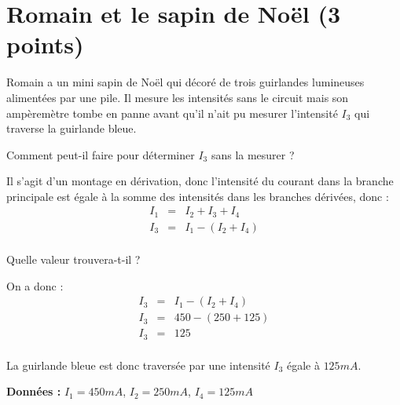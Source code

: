 \section{Romain et le sapin de Noël (3 points)}

	Romain a un mini sapin de Noël qui décoré de trois guirlandes lumineuses alimentées par une pile. Il mesure les intensités sans le circuit mais son ampèremètre tombe en panne avant qu'il n'ait pu mesurer l'intensité $I_3$ qui traverse la guirlande bleue.
	
	\begin{questions}
		\question Comment peut-il faire pour déterminer $I_3$ sans la mesurer ? 
		
		\begin{solution}
			Il s'agit d'un montage en dérivation, donc l'intensité du courant dans la branche principale est égale à la somme des intensités dans les branches dérivées, donc :
			\begin{eqnarray*}
				I_1 &=& I_2 + I_3 + I_4 \\
				I_3 &=& I_1 - (I_2 + I_4) \\
			\end{eqnarray*}
		\vspace*{-0.8cm}
		\end{solution}
	
		\question Quelle valeur trouvera-t-il ?
		
		\begin{solution}
			On a donc :			
			\vspace*{-0.8cm}
			\begin{eqnarray*}			
				I_3 &=& I_1 - (I_2 + I_4)\\
				I_3 &=& 450 - (250 + 125)\\
				I_3 &=& 125\\
			\end{eqnarray*}		
		
		\vspace*{-0.8cm}			
			La guirlande bleue est donc traversée par une intensité $I_3$ égale à $125 mA$.
		\end{solution}
	\end{questions}

\textbf{Données : } $I_1 = 450 mA$, $I_2 = 250 mA$, $I_4 = 125 mA$

